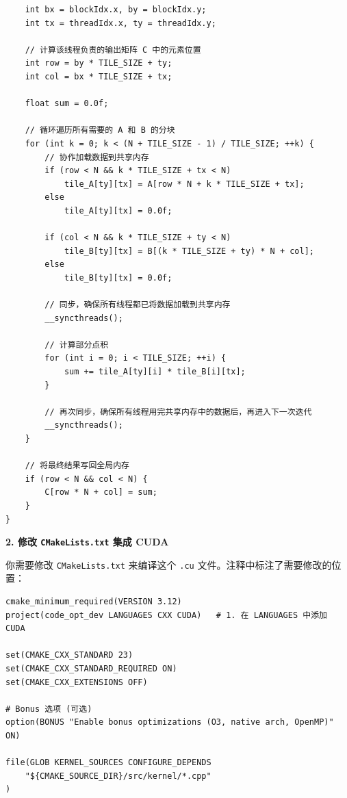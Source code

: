 \documentclass[11pt, a4paper]{article}
\begin{document}
\begin{aibox}
\begin{tcolorbox}[colback=white,colframe=gray!50!white,boxrule=0.5pt,arc=2pt,left=5pt,right=5pt,top=5pt,bottom=5pt]
\begin{verbatim}
    int bx = blockIdx.x, by = blockIdx.y;
    int tx = threadIdx.x, ty = threadIdx.y;

    // 计算该线程负责的输出矩阵 C 中的元素位置
    int row = by * TILE_SIZE + ty;
    int col = bx * TILE_SIZE + tx;

    float sum = 0.0f;

    // 循环遍历所有需要的 A 和 B 的分块
    for (int k = 0; k < (N + TILE_SIZE - 1) / TILE_SIZE; ++k) {
        // 协作加载数据到共享内存
        if (row < N && k * TILE_SIZE + tx < N)
            tile_A[ty][tx] = A[row * N + k * TILE_SIZE + tx];
        else
            tile_A[ty][tx] = 0.0f;

        if (col < N && k * TILE_SIZE + ty < N)
            tile_B[ty][tx] = B[(k * TILE_SIZE + ty) * N + col];
        else
            tile_B[ty][tx] = 0.0f;

        // 同步，确保所有线程都已将数据加载到共享内存
        __syncthreads();

        // 计算部分点积
        for (int i = 0; i < TILE_SIZE; ++i) {
            sum += tile_A[ty][i] * tile_B[i][tx];
        }

        // 再次同步，确保所有线程用完共享内存中的数据后，再进入下一次迭代
        __syncthreads();
    }

    // 将最终结果写回全局内存
    if (row < N && col < N) {
        C[row * N + col] = sum;
    }
}
\end{verbatim}
\end{tcolorbox}

\vspace{0.5em}
\textbf{2. 修改 \texttt{CMakeLists.txt} 集成 CUDA}

你需要修改 \texttt{CMakeLists.txt} 来编译这个 \texttt{.cu} 文件。注释中标注了需要修改的位置：

\begin{tcolorbox}[colback=white,colframe=gray!50!white,boxrule=0.5pt,arc=2pt,left=5pt,right=5pt,top=5pt,bottom=5pt]
\begin{verbatim}
cmake_minimum_required(VERSION 3.12)
project(code_opt_dev LANGUAGES CXX CUDA)   # 1. 在 LANGUAGES 中添加 CUDA

set(CMAKE_CXX_STANDARD 23)
set(CMAKE_CXX_STANDARD_REQUIRED ON)
set(CMAKE_CXX_EXTENSIONS OFF)

# Bonus 选项 (可选)
option(BONUS "Enable bonus optimizations (O3, native arch, OpenMP)" ON)

file(GLOB KERNEL_SOURCES CONFIGURE_DEPENDS
    "${CMAKE_SOURCE_DIR}/src/kernel/*.cpp"
)


\end{verbatim}
\end{tcolorbox}
\end{aibox}
\end{document}
